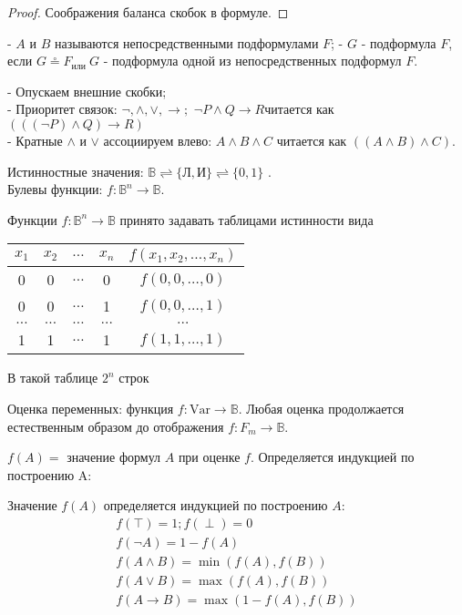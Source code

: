 \begin{proof}
Соображения баланса скобок в формуле.
\end{proof}
\begin{defn}
- $A$ и $B$ называются непосредственными подформулами $F$;
- $G$ - подформула $F$, если $G \stackrel{\circ}{=} F_{\text {или }} G$ - подформула одной из непосредственных подформул $F$.
\end{defn}
\vskip 0.2in
- Опускаем внешние скобки;\\
- Приоритет связок: $\neg, \wedge, \vee, \rightarrow ;$ $\neg P \wedge Q \rightarrow R$читается как $(((\neg P) \wedge Q) \rightarrow R)$\\
- Кратные $\wedge$ и $\vee$ ассоциируем влево:
$A \wedge B \wedge C$ читается как $((A \wedge B) \wedge C)$.\\
\vskip 0.2in
\begin{defn}
Истинностные значения: $\mathbb{B} \rightleftharpoons\{\text{Л}, \text{И}\} \rightleftharpoons\{0,1\}$ .\\
Булевы функции: $f: \mathbb{B}^{n} \rightarrow \mathbb{B}$.
\end{defn}
\vskip 0.2in
Функции $f: \mathbb{B}^{n} \rightarrow \mathbb{B}$ принято задавать таблицами истинности
вида 
\begin{tabular}{cccc|c}
$x_{1}$ & $x_{2}$ & $\ldots$ & $x_{n}$ & $f\left(x_{1}, x_{2}, \ldots, x_{n}\right)$ \\
\hline 0 & 0 & $\ldots$ & 0 & $f(0,0, \ldots, 0)$ \\
0 & 0 & $\ldots$ & 1 & $f(0,0, \ldots, 1)$ \\
$\ldots$ & $\ldots$ & $\ldots$ & $\ldots$ & $\ldots$ \\
1 & 1 & $\ldots$ & 1 & $f(1,1, \ldots, 1)$
\end{tabular}
В такой таблице $2^{n}$ строк
\vskip 0.2in
\begin{defn}
Оценка переменных: функция $f: \mathrm{Var} \rightarrow \mathbb{B}$.
Любая оценка продолжается естественным образом до отображения $f: F_m \rightarrow \mathbb{B}$.
\end{defn}
\begin{defn}
$f(A)=$ значение формул $A$ при оценке $f$. Определяется индукцией по построению A:
\end{defn}
\vskip 0.2in
Значение $f(A)$ определяется индукцией по построению $A:$
$$
\begin{array}{l}
f(\top)=1 ; f(\perp)=0 \\
f(\neg A)=1-f(A) \\
f(A \wedge B)=\min (f(A), f(B)) \\
f(A \vee B)=\max (f(A), f(B)) \\
f(A \rightarrow B)=\max (1-f(A), f(B))
\end{array}
$$
